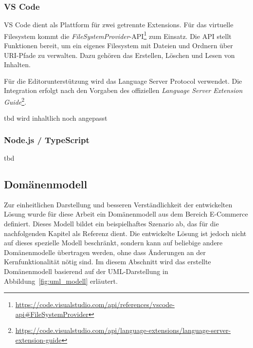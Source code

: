 


\subsubsection*{VS Code}
VS Code dient als Plattform für zwei getrennte Extensions. Für das virtuelle Filesystem kommt die \textit{FileSystemProvider}-API\footnote{\url{https://code.visualstudio.com/api/references/vscode-api\#FileSystemProvider}} zum Einsatz. Die API stellt Funktionen bereit, um ein eigenes Filesystem mit Dateien und Ordnern über URI-Pfade zu verwalten. Dazu gehören das Erstellen, Löschen und Lesen von Inhalten. 

Für die Editorunterstützung wird das Language Server Protocol verwendet. Die Integration erfolgt nach den Vorgaben des offiziellen \textit{Language Server Extension Guide}\footnote{\url{https://code.visualstudio.com/api/language-extensions/language-server-extension-guide}}.

tbd wird inhaltlich noch angepasst

\subsubsection*{Node.js / TypeScript}
tbd

\pagebreak

\subsection{Domänenmodell}
Zur einheitlichen Darstellung und besseren Verständlichkeit der entwickelten Lösung wurde für diese Arbeit ein Domänenmodell aus dem Bereich E-Commerce definiert. Dieses Modell bildet ein beispielhaftes Szenario ab, das für die nachfolgenden Kapitel als Referenz dient. Die entwickelte Lösung ist jedoch nicht auf dieses spezielle Modell beschränkt, sondern kann auf beliebige andere Domänenmodelle übertragen werden, ohne dass Änderungen an der Kernfunktionalität nötig sind. Im diesem Abschnitt wird das erstellte Domänenmodell basierend auf der UML-Darstellung in Abbildung~\ref{fig:uml_modell} erläutert.

